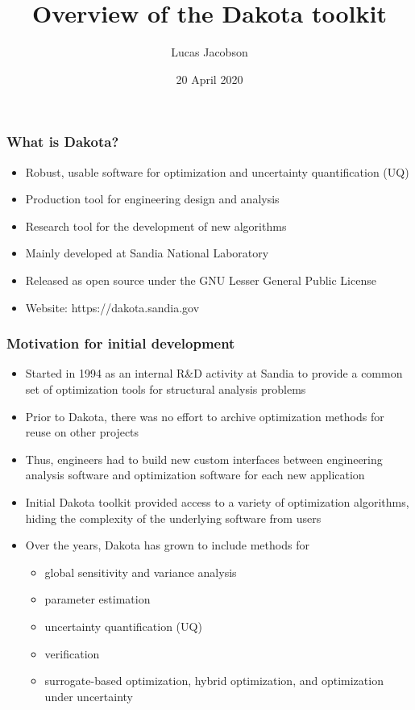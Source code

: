 \documentclass[t]{beamer}
\title{Overview of the Dakota toolkit}
\author{Lucas Jacobson}
\institute{University of Wisconsin--Madison}
\date{20 April 2020}
\begin{document}

\begin{frame}
  \titlepage
\end{frame}


\begin{frame}
  \frametitle{What is Dakota?}
  \begin{itemize}
    \item Robust, usable software for optimization and uncertainty
          quantification (UQ)
    \item Production tool for engineering design and analysis
    \item Research tool for the development of new algorithms
    \item Mainly developed at Sandia National Laboratory
    \item Released as open source under the GNU Lesser General Public License
    \item Website: https://dakota.sandia.gov
  \end{itemize}
\end{frame}


\begin{frame}
  \frametitle{Motivation for initial development}
  \begin{itemize}
    \item Started in 1994 as an internal R\&D activity at Sandia to provide a
          common set of optimization tools for structural analysis problems
    \item Prior to Dakota, there was no effort to archive optimization methods
          for reuse on other projects
    \item Thus, engineers had to build new custom interfaces between engineering
          analysis software and optimization software for each new application
    \item Initial Dakota toolkit provided access to a variety of optimization
          algorithms, hiding the complexity of the underlying software from
          users
    \item Over the years, Dakota has grown to include methods for
    \begin{itemize}
      \item global sensitivity and variance analysis
      \item parameter estimation
      \item uncertainty quantification (UQ)
      \item verification
      \item surrogate-based optimization, hybrid optimization, and optimization
            under uncertainty
    \end{itemize}
  \end{itemize}
\end{frame}
\end{document}
